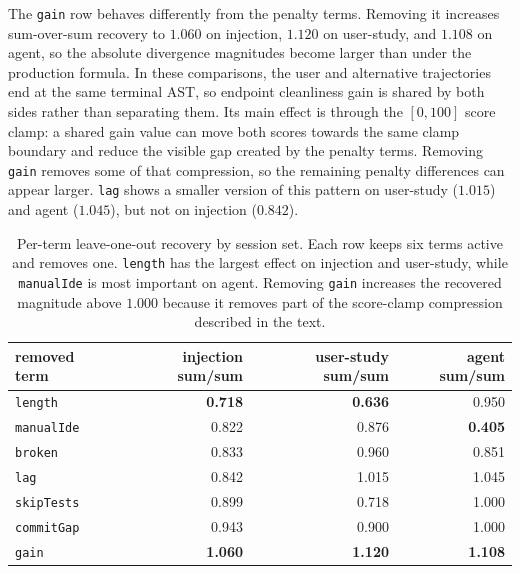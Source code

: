 The \texttt{gain} row behaves differently from the penalty terms. Removing it increases sum-over-sum recovery to $1.060$ on injection, $1.120$ on user-study, and $1.108$ on agent, so the absolute divergence magnitudes become larger than under the production formula. In these comparisons, the user and alternative trajectories end at the same terminal AST, so endpoint cleanliness gain is shared by both sides rather than separating them. Its main effect is through the $[0,100]$ score clamp: a shared gain value can move both scores towards the same clamp boundary and reduce the visible gap created by the penalty terms. Removing \texttt{gain} removes some of that compression, so the remaining penalty differences can appear larger. \texttt{lag} shows a smaller version of this pattern on user-study ($1.015$) and agent ($1.045$), but not on injection ($0.842$).

\begin{table}[htbp]
\centering
\small
\begin{tabular}{lrrr}
\hline
\textbf{removed term} & \textbf{injection sum/sum} & \textbf{user-study sum/sum} & \textbf{agent sum/sum} \\
\hline
\texttt{length}    & \textbf{0.718} & \textbf{0.636} & 0.950          \\
\texttt{manualIde} & 0.822          & 0.876          & \textbf{0.405} \\
\texttt{broken}    & 0.833          & 0.960          & 0.851          \\
\texttt{lag}       & 0.842          & 1.015          & 1.045          \\
\texttt{skipTests} & 0.899          & 0.718          & 1.000          \\
\texttt{commitGap} & 0.943          & 0.900          & 1.000          \\
\texttt{gain}      & \textbf{1.060} & \textbf{1.120} & \textbf{1.108} \\
\hline
\end{tabular}
\caption{Per-term leave-one-out recovery by session set. Each row keeps six terms active and removes one. \texttt{length} has the largest effect on injection and user-study, while \texttt{manualIde} is most important on agent. Removing \texttt{gain} increases the recovered magnitude above $1.000$ because it removes part of the score-clamp compression described in the text.}
\label{tab:results-ablation-loo}
\end{table}

